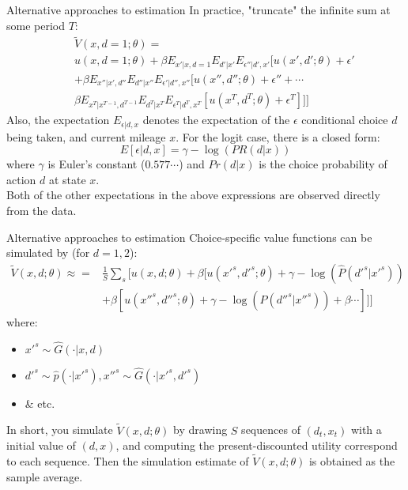 \begin{frame}{Alternative approaches to estimation}
In practice, "truncate" the infinite sum at some period $T$: 
\begin{eqnarray*} 
&& \tilde V(x, d=1;\theta) =\\
&& u(x, d=1; \theta) + \beta E_{x'|x, d=1} E_{d'|x'} E_{\epsilon''|d', x'} [u(x', d';\theta) + \epsilon' \\
&& + \beta E_{x''|x', d''} E_{d''|x''} E_{\epsilon'|d'', x''} [u(x'', d'';\theta) + \epsilon'' + \cdots \\
&& \beta E_{x^T|x^{T-1}, d^{T-1}} E_{d^T|x^T} E_{\epsilon^T|d^T, x^T} [u(x^T, d^T;\theta) + \epsilon^T ]]]
\end{eqnarray*}
Also, the expectation $E_{\epsilon|d, x}$ denotes the expectation of the $\epsilon$ conditional choice $d$ being taken, and current mileage $x$. For the logit case, there is a closed form:
$$ E[\epsilon | d, x] = \gamma - \log(PR(d|x))$$
where $\gamma$ is Euler's constant ($0.577\cdots$) and $Pr(d|x)$ is the choice probability of action $d$ at state $x$. \\
\vspace{2mm}
Both of the other expectations in the above expressions are observed directly from the data. 
\end{frame}

\begin{frame}{Alternative approaches to estimation}
Choice-specific value functions can be simulated by (for $d=1,2$): 
\begin{eqnarray*}
\tilde V (x, d; \theta) \approx = & \frac 1 S \sum_s [ u(x, d;\theta) + \beta [ u(x'^s, d'^s;\theta) + \gamma - \log(\hat P(d'^s|x'^s)) \\
& +\beta [ u(x''^s, d''^s;\theta) + \gamma - \log (\hat P (d''^s |x''^s)) + \beta \cdots ]]]
\end{eqnarray*}
where:
\begin{itemize}
\item $x'^s \sim \hat G(\cdot | x, d)$ 
\item $d'^s \sim \hat p(\cdot | x'^s), x''^s \sim \hat G(\cdot | x'^s, d'^s)$ 
\item \& etc. 
\end{itemize}
In short, you simulate $\tilde V (x, d;\theta)$ by drawing $S$ \alert{sequences} of $(d_t, x_t)$ with a initial value of $(d, x)$, and computing the present-discounted utility correspond to each sequence. Then the simulation estimate of $\tilde V (x, d;\theta)$ is obtained as the sample average. 
\end{frame}


